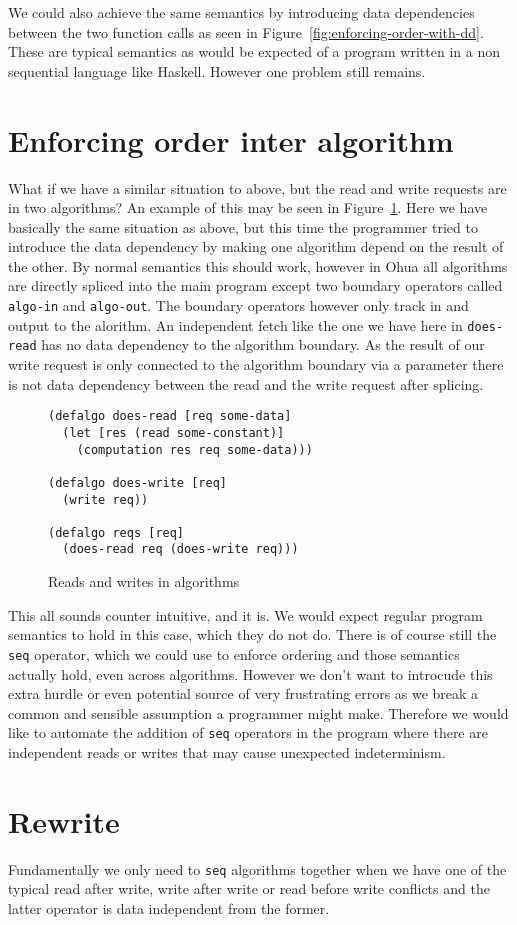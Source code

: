 We could also achieve the same semantics by introducing data dependencies between the two function calls as seen in Figure~\ref{fig:enforcing-order-with-dd}.
These are typical semantics as would be expected of a program written in a non sequential language like Haskell.
However one problem still remains.

\section{Enforcing order inter algorithm}

What if we have a similar situation to above, but the read and write requests are in two algorithms?
An example of this may be seen in Figure~\ref{fig:reads-and-writes-in-algos}.
Here we have basically the same situation as above, but this time the programmer tried to introduce the data dependency by making one algorithm depend on the result of the other.
By normal semantics this should work, however in Ohua all algorithms are directly spliced into the main program except two boundary operators called \texttt{algo-in} and \texttt{algo-out}.
The boundary operators however only track in and output to the alorithm.
An independent fetch like the one we have here in \texttt{does-read} has no data dependency to the algorithm boundary.
As the result of our write request is only connected to the algorithm boundary via a parameter there is not data dependency between the read and the write request after splicing.

\begin{figure}
\begin{verbatim}
(defalgo does-read [req some-data]
  (let [res (read some-constant)]
    (computation res req some-data)))

(defalgo does-write [req]
  (write req))

(defalgo reqs [req]
  (does-read req (does-write req)))
\end{verbatim}
\caption{Reads and writes in algorithms}
\label{fig:reads-and-writes-in-algos}
\end{figure}

This all sounds counter intuitive, and it is.
We would expect regular program semantics to hold in this case, which they do not do.
There is of course still the \texttt{seq} operator, which we could use to enforce ordering and those semantics actually hold, even across algorithms.
However we don't want to introcude this extra hurdle or even potential source of very frustrating errors as we break a common and sensible assumption a programmer might make.
Therefore we would like to automate the addition of \texttt{seq} operators in the program where there are independent reads or writes that may cause unexpected indeterminism.

\section{Rewrite}

Fundamentally we only need to \texttt{seq} algorithms together when we have one of the typical read after write, write after write or read before write conflicts and the latter operator is data independent from the former.

